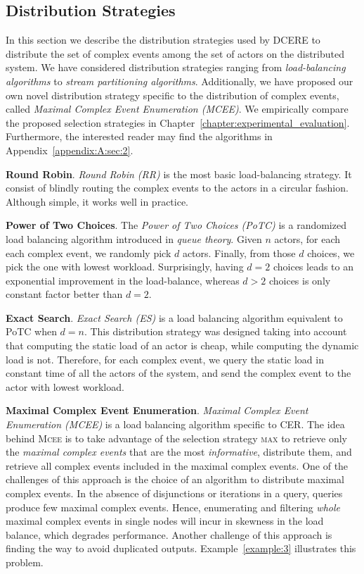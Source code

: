 \subsection{Distribution Strategies}\label{subsec:dcere:distribution-strategies}

In this section we describe the distribution strategies used by DCERE to distribute the set of complex events among the set of actors on the distributed system. We have considered distribution strategies ranging from \emph{load-balancing algorithms} to \emph{stream partitioning algorithms}. Additionally, we have proposed our own novel distribution strategy specific to the distribution of complex events, called \emph{Maximal Complex Event Enumeration (MCEE)}. We empirically compare the proposed selection strategies in Chapter~\ref{chapter:experimental_evaluation}. Furthermore, the interested reader may find the algorithms in Appendix~\ref{appendix:A:sec:2}.

\textbf{Round Robin}. \emph{Round Robin (RR)} is the most basic load-balancing strategy. It consist of blindly routing the complex events to the actors in a circular fashion. Although simple, it works well in practice.

\textbf{Power of Two Choices}. The \emph{Power of Two Choices (PoTC)} \cite{load-balancing-1} is a randomized load balancing algorithm introduced in \emph{queue theory}. Given $n$ actors, for each each complex event, we randomly pick $d$ actors. Finally, from those $d$ choices, we pick the one with lowest workload. Surprisingly, having $d = 2$ choices leads to an exponential improvement in the load-balance, whereas $d > 2$ choices is only constant factor better than $d = 2$.

\textbf{Exact Search}. \emph{Exact Search (ES)} is a load balancing algorithm equivalent to PoTC when $d = n$. This distribution strategy was designed taking into account that computing the static load of an actor is cheap, while computing the dynamic load is not. Therefore, for each complex event, we query the static load in constant time of all the actors of the system, and send the complex event to the actor with lowest workload.

\textbf{Maximal Complex Event Enumeration}.\label{} \emph{Maximal Complex Event Enumeration (MCEE)} is a load balancing algorithm specific to CER. The idea behind \textsc{Mcee} is to take advantage of the selection strategy \textsc{max} to retrieve only the \emph{maximal complex events} that are the most \emph{informative}, distribute them, and retrieve all complex events included in the maximal complex events. One of the challenges of this approach is the choice of an algorithm to distribute maximal complex events. In the absence of disjunctions or iterations in a query, queries produce few maximal complex events. Hence, enumerating and filtering \emph{whole} maximal complex events in single nodes will incur in skewness in the load balance, which degrades performance. Another challenge of this approach is finding the way to avoid duplicated outputs. Example~\ref{example:3} illustrates this problem.

